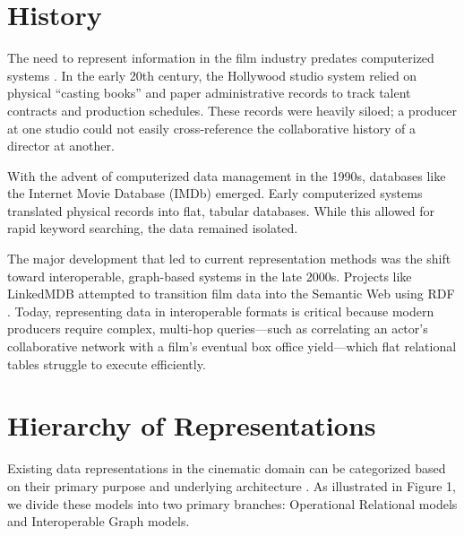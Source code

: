 \documentclass[sigconf]{acmart}
\begin{document}
\section{History}
The need to represent information in the film industry predates computerized systems \cite{course}. In the early 20th century, the Hollywood studio system relied on physical ``casting books'' and paper administrative records to track talent contracts and production schedules. These records were heavily siloed; a producer at one studio could not easily cross-reference the collaborative history of a director at another.

With the advent of computerized data management in the 1990s, databases like the Internet Movie Database (IMDb) emerged. Early computerized systems translated physical records into flat, tabular databases. While this allowed for rapid keyword searching, the data remained isolated. 

The major development that led to current representation methods was the shift toward interoperable, graph-based systems in the late 2000s. Projects like LinkedMDB attempted to transition film data into the Semantic Web using RDF \cite{linkedmdb}. Today, representing data in interoperable formats is critical because modern producers require complex, multi-hop queries—such as correlating an actor's collaborative network with a film's eventual box office yield—which flat relational tables struggle to execute efficiently.

\section{Hierarchy of Representations}
Existing data representations in the cinematic domain can be categorized based on their primary purpose and underlying architecture \cite{course}. As illustrated in Figure 1, we divide these models into two primary branches: Operational Relational models and Interoperable Graph models.
\end{document}
